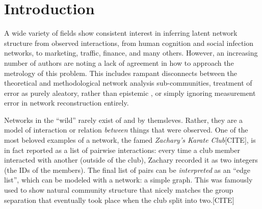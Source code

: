\documentclass[%
	12pt,
		oneside,
		letterpaper
]{book}
\renewcommand{\contentsname}%
    {Table of contents}%
\renewcommand*\contentsname{Table of contents}
\newcommand\contentsname{Table of contents}
\begin{document}
    \renewcommand{\contentsname}{List of Tables}
\listoftables %
\newpage

    \renewcommand{\contentsname}{List of Figures}
\listoffigures %
\newpage

% 

\newpage
\setlength{\parskip}{0em}
\renewcommand{\baselinestretch}{2}
\small\normalsize



\chapter{Introduction}\label{introduction}

A wide variety of fields show consistent interest in inferring latent
network structure from observed interactions, from human cognition and
social infection networks, to marketing, traffic, finance, and many
others. \autocite{Inferringnetworksdiffusion_GomezRodriguez2012}
However, an increasing number of authors are noting a lack of agreement
in how to approach the metrology of this problem. This includes rampant
disconnects between the theoretical and methodological network analysis
sub-communities\autocite{Statisticalinferencelinks_Peel2022}, treatment
of error as purely aleatory, rather than epistemic
\autocite{Measurementerrornetwork_Wang2012}, or simply ignoring
measurement error in network reconstruction
entirely\autocite{ReconstructingNetworksUnknown_Peixoto2018}.

Networks in the ``wild'' rarely exist of and by themsleves. Rather, they
are a model of interaction or relation \emph{between} things that were
observed. One of the most beloved examples of a network, the famed
\emph{Zachary's Karate Club}{[}CITE{]}, is in fact reported as a list of
pairwise interactions: every time a club member interacted with another
(outside of the club), Zachary recorded it as two integers (the IDs of
the members). The final list of pairs can be \emph{interpreted} as an
``edge list'', which can be modeled with a network: a simple graph. This
was famously used to show natural community structure that nicely
matches the group separation that eventually took place when the club
split into two.{[}CITE{]}
\end{document}
